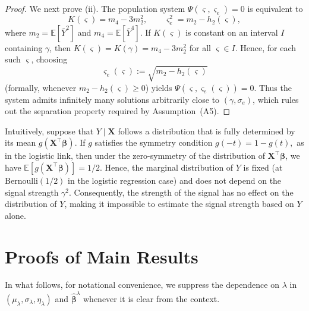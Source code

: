 \documentclass[12pt,reqno]{amsart}
\newcommand{\E}{\mathbb{E}}
\newcommand{\ccc}{\color{black}}
\renewcommand{\hat}{\widehat}
\def\bbeta{\bm{\beta}}
\begin{document}
{\begin{proof}
We next prove (ii).
The population system
$\Psi(\varsigma,\varsigma_e)=0$ is equivalent to
\[
K(\varsigma)=m_4-3m_2^2,
\qquad
\varsigma_e^2=m_2-h_2(\varsigma),
\]
where $m_2=\E[\bar Y^2]$ and $m_4=\E[\bar Y^4]$.
If $K(\varsigma)$ is constant on an interval $I$ containing $\gamma$, then
$K(\varsigma)=K(\gamma)=m_4-3m_2^2$ for all $\varsigma\in I$.
Hence, for each such $\varsigma$, choosing
\[
\varsigma_e(\varsigma):=\sqrt{m_2-h_2(\varsigma)}
\]
(formally, whenever $m_2-h_2(\varsigma)\ge 0$) yields
$\Psi(\varsigma,\varsigma_e(\varsigma))=0$.
Thus the system admits infinitely many solutions arbitrarily close to $(\gamma,\sigma_e)$,
which rules out the separation property required by Assumption~(A5).
\end{proof}
Intuitively, suppose that $Y \mid \bm{X}$ follows a distribution that is fully determined by its mean $g(\bm{X}^\top \bm{\beta})$. 
If $g$ satisfies the symmetry condition $g(-t)=1-g(t),$
as in the logistic link, then under the zero-symmetry of the distribution of $\bm{X}^\top \bm{\beta}$, we have $\mathbb{E}[g(\bm{X}^\top \bm{\beta})]=1/2.$
Hence, the marginal distribution of $Y$ is fixed (at $\mathrm{Bernoulli}(1/2)$ in the logistic regression case) and does not depend on the signal strength $\gamma^2$. 
Consequently, the strength of the signal has no effect on the distribution of $Y$, making it impossible to estimate the signal strength based on $Y$ alone.
}

\section{Proofs of Main Results}
{\ccc
In what follows, for notational convenience, we suppress the dependence on $\lambda$ in $(\mu_\lambda,\sigma_\lambda,\eta_\lambda)$ and $\hat{\bbeta}^{\lambda}$ whenever it is clear from the context.

}
\end{document}
